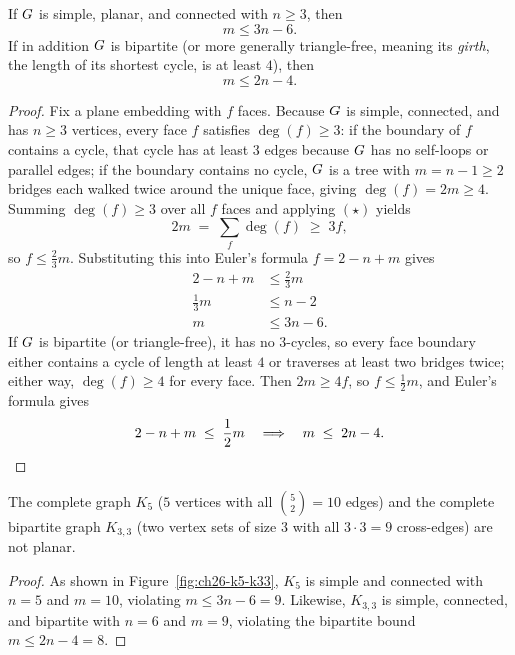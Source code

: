 \begin{theorem}
\label{ch26:thm-edgebound}
If $G$ is simple, planar, and connected with $n\ge 3$, then
\[
  m \le 3n - 6.
\]
If in addition $G$ is bipartite (or more generally triangle-free, meaning its
\emph{girth}, the length of its shortest cycle, is at least $4$), then
\[
  m \le 2n - 4.
\]
\end{theorem}

\begin{proof}
Fix a plane embedding with $f$ faces. Because $G$ is simple, connected, and has $n\ge 3$
vertices, every face $f$ satisfies $\deg(f)\ge 3$: if the boundary of $f$ contains a cycle,
that cycle has at least $3$ edges because $G$ has no self-loops or parallel edges; if
the boundary contains no cycle, $G$ is a tree with $m = n - 1 \ge 2$ bridges each
walked twice around the unique face, giving $\deg(f) = 2m \ge 4$. Summing $\deg(f)\ge 3$
over all $f$ faces and applying $(\star)$ yields
\[
  2m \;=\; \sum_{f} \deg(f) \;\ge\; 3f,
\]
so $f \le \frac{2}{3}m$. Substituting this into Euler's formula $f = 2 - n + m$ gives
\begin{align*}
  2 - n + m &\le \frac{2}{3}m \\
  \frac{1}{3}m &\le n - 2 \\
  m &\le 3n - 6.
\end{align*}
If $G$ is bipartite (or triangle-free), it has no $3$-cycles, so every face boundary
either contains a cycle of length at least $4$ or traverses at least two bridges twice;
either way, $\deg(f)\ge 4$ for every face. Then $2m \ge 4f$, so $f \le \frac{1}{2}m$, and
Euler's formula gives
\[
  2 - n + m \;\le\; \frac{1}{2}m \quad\Longrightarrow\quad m \;\le\; 2n - 4. \qedhere
\]
\end{proof}

\begin{corollary}
\label{ch26:cor-k5k33}
The complete graph $K_5$ ($5$ vertices with all $\binom{5}{2}=10$ edges) and the complete
bipartite graph $K_{3,3}$ (two vertex sets of size $3$ with all $3\cdot 3 = 9$ cross-edges)
are not planar.
\end{corollary}

\begin{proof}
As shown in Figure~\ref{fig:ch26-k5-k33}, $K_5$ is simple and connected with $n=5$ and
$m=10$, violating $m \le 3n-6 = 9$. Likewise, $K_{3,3}$ is simple, connected, and bipartite
with $n=6$ and $m=9$, violating the bipartite bound $m \le 2n-4 = 8$.
\end{proof}

